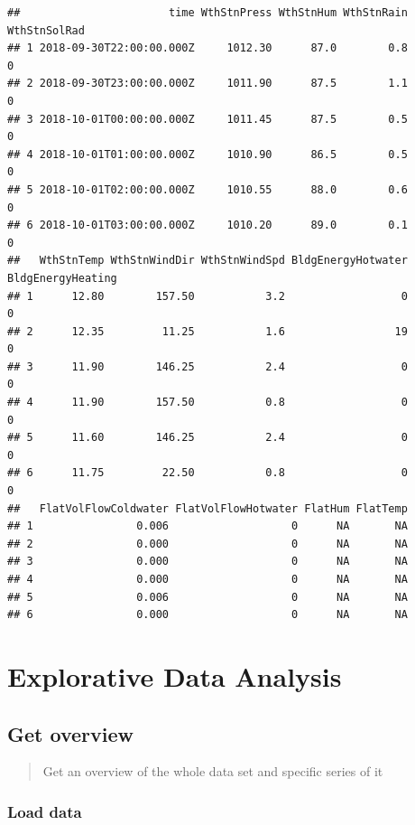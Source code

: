 \documentclass[
]{book}
\begin{document}
\begin{verbatim}
##                       time WthStnPress WthStnHum WthStnRain WthStnSolRad
## 1 2018-09-30T22:00:00.000Z     1012.30      87.0        0.8            0
## 2 2018-09-30T23:00:00.000Z     1011.90      87.5        1.1            0
## 3 2018-10-01T00:00:00.000Z     1011.45      87.5        0.5            0
## 4 2018-10-01T01:00:00.000Z     1010.90      86.5        0.5            0
## 5 2018-10-01T02:00:00.000Z     1010.55      88.0        0.6            0
## 6 2018-10-01T03:00:00.000Z     1010.20      89.0        0.1            0
##   WthStnTemp WthStnWindDir WthStnWindSpd BldgEnergyHotwater BldgEnergyHeating
## 1      12.80        157.50           3.2                  0                 0
## 2      12.35         11.25           1.6                 19                 0
## 3      11.90        146.25           2.4                  0                 0
## 4      11.90        157.50           0.8                  0                 0
## 5      11.60        146.25           2.4                  0                 0
## 6      11.75         22.50           0.8                  0                 0
##   FlatVolFlowColdwater FlatVolFlowHotwater FlatHum FlatTemp
## 1                0.006                   0      NA       NA
## 2                0.000                   0      NA       NA
## 3                0.000                   0      NA       NA
## 4                0.000                   0      NA       NA
## 5                0.006                   0      NA       NA
## 6                0.000                   0      NA       NA
\end{verbatim}

\hypertarget{explorative-data-analysis}{%
\chapter{Explorative Data Analysis}\label{explorative-data-analysis}}

\hypertarget{get-overview}{%
\section{Get overview}\label{get-overview}}

\begin{quote}
Get an overview of the whole data set and specific series of it
\end{quote}

\hypertarget{load-data}{%
\subsection{Load data}\label{load-data}}
\end{document}
